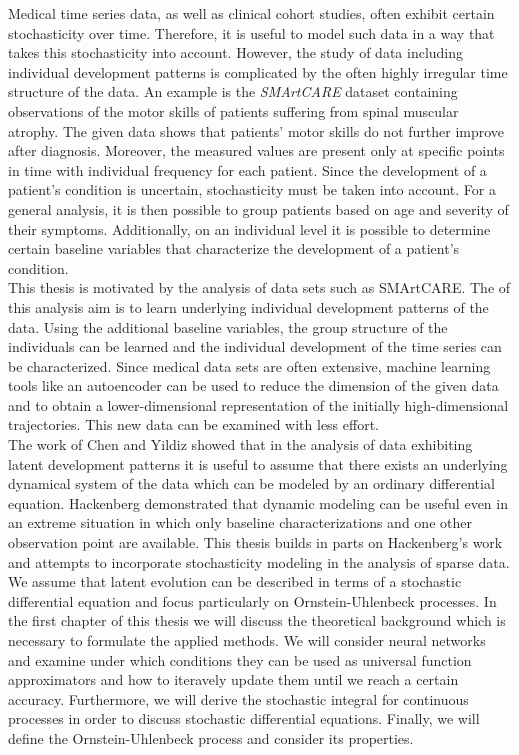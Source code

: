 \documentclass[11pt,titlepage]{article}
\theoremstyle{definition}
\theoremstyle{remark}
\begin{document}
	Medical time series data, as well as clinical cohort studies, often exhibit certain stochasticity over time. Therefore, it is useful to model such data in a way that takes this stochasticity into account. However, the study of data including individual development patterns is complicated by the often highly irregular time structure of the data. 
	An example is the \textsl{SMArtCARE} dataset containing observations of the motor skills of patients suffering from spinal muscular atrophy. The given data shows that patients' motor skills do not further improve after diagnosis. Moreover, the measured values are present only at specific points in time with individual frequency for each patient. 
	Since the development of a patient’s condition is uncertain, stochasticity must be taken into account. For a general analysis, it is then 
	possible to group patients based on age and severity of their symptoms. Additionally, on an 
	individual level it is possible to determine certain baseline variables that characterize the 
	development of a patient’s condition.\\
	This thesis is motivated by the analysis of data sets such as SMArtCARE. The of this analysis aim is to learn underlying individual development patterns of the data. Using the additional baseline variables, the group structure of the individuals can be learned and the individual development of the time series can be characterized. Since medical data sets are often extensive, machine learning 
	tools like an autoencoder can be used to reduce the dimension of the given data and to 
	obtain a lower-dimensional representation of the initially high-dimensional trajectories. This new data can be examined with less effort.\\
	The work of Chen \cite{Chen2018neural} and Yildiz \cite{Yildiz2019ode2vae} showed that in the analysis of data exhibiting latent development patterns it is useful to assume that there exists an underlying dynamical system of the data which can be modeled by an ordinary differential equation. Hackenberg \cite{Hackenberg2022} demonstrated that dynamic modeling can be useful even in an extreme situation in which only baseline characterizations and one other observation point are available. This thesis builds in parts on  Hackenberg's work and attempts to incorporate stochasticity modeling in the analysis of sparse data. We assume that latent evolution can be described in terms of a stochastic differential equation and focus particularly on Ornstein-Uhlenbeck processes. 
	\newpage
	In the first chapter of this thesis we will discuss the theoretical background which is necessary to formulate the applied methods. We will consider neural networks and examine under which conditions they can be used as universal function approximators and how to iteravely update them until we reach a certain accuracy. Furthermore, we will derive the stochastic integral for continuous processes in order to discuss stochastic differential equations. Finally, we will define the Ornstein-Uhlenbeck process and consider its properties.
\end{document}
